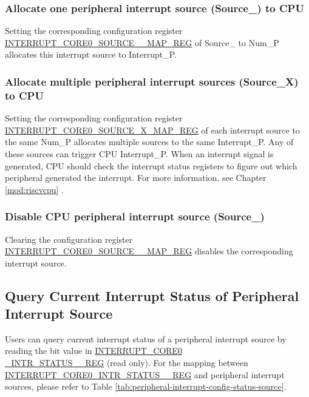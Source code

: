 \documentclass[main\_\_EN.tex]{subfiles}
\begin{document}
\subsubsection{Allocate one peripheral interrupt source (Source\_) to CPU}
Setting the corresponding configuration register \hyperref[regdesc:INTERRUPTCORE0CACHECORE0ACSINTMAPREG]{INTERRUPT\_CORE0\_SOURCE\_\_MAP\_REG} of Source\_ to Num\_P allocates this interrupt source to Interrupt\_P. 

\subsubsection{Allocate multiple peripheral interrupt sources (Source\_X) to CPU}
Setting the corresponding configuration register \hyperref[regdesc:INTERRUPTCORE0CACHECORE0ACSINTMAPREG]{INTERRUPT\_CORE0\_SOURCE\_X\_MAP\_REG} of each interrupt source to the same Num\_P allocates multiple sources to the same Interrupt\_P. Any of these sources can trigger CPU Interrupt\_P. When an interrupt signal is generated, CPU should check the interrupt status registers to figure out which peripheral generated the interrupt. For more information, see Chapter \ref{mod:riscvcpu} \textit{}.

\subsubsection{Disable CPU peripheral interrupt source (Source\_)}
Clearing the configuration register \hyperref[regdesc:INTERRUPTCORE0CACHECORE0ACSINTMAPREG]{INTERRUPT\_CORE0\_SOURCE\_\_MAP\_REG} disables the corresponding interrupt source.

\subsection{Query Current Interrupt Status of Peripheral Interrupt Source}

Users can query current interrupt status of a peripheral interrupt source by reading the bit value in \hyperref[regdesc:INTERRUPTCORE0INTRSTATUS0REG]{INTERRUPT\_CORE0\\\_INTR\_STATUS\_\_REG} (read only). For the mapping between \hyperref[regdesc:INTERRUPTCORE0INTRSTATUS0REG]{INTERRUPT\_CORE0\_INTR\_STATUS\_\_REG} and peripheral interrupt sources, please refer to Table \ref{tab:peripheral-interrupt-config-status-source}.
\end{document}
